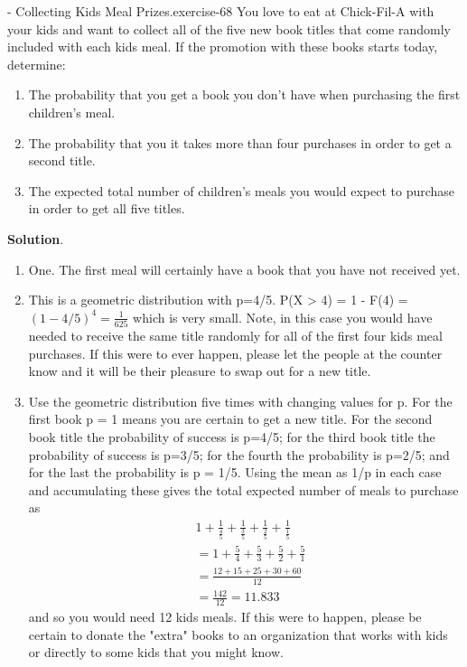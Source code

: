 \documentclass[10pt,]{book}
\numberwithin{equation}{section}
\begin{document}
\begin{inlineexercise}{- Collecting Kids Meal Prizes.}{exercise-68}%
\hypertarget{p-1010}{}%
You love to eat at Chick-Fil-A with your kids and want to collect all of the five new book titles that come randomly included with each kids meal.  If the promotion with these books starts today, determine: \leavevmode%
\begin{enumerate}
\item\hypertarget{li-274}{}The probability that you get a book you don't have when purchasing the first children's meal.%
\item\hypertarget{li-275}{}The probability that you it takes more than four purchases in order to get a second title.%
\item\hypertarget{li-276}{}The expected total number of children's meals you would expect to purchase in order to get all five titles.%
\end{enumerate}
%
\textbf{Solution}.\quad%
\hypertarget{p-1011}{}%
\leavevmode%
\begin{enumerate}
\item\hypertarget{li-277}{}One. The first meal will certainly have a book that you have not received yet.%
\item\hypertarget{li-278}{}This is a geometric distribution with p=4/5.  P(X > 4) = 1 - F(4) = \((1 - 4/5)^4 = \frac{1}{625}\) which is very small. Note, in this case you would have needed to receive the same title randomly for all of the first four kids meal purchases. If this were to ever happen, please let the people at the counter know and it will be their pleasure to swap out for a new title.%
\item\hypertarget{li-279}{}Use the geometric distribution five times with changing values for p. For the first book p = 1 means you are certain to get a new title. For the second book title the probability of success is p=4/5; for the third book title the probability of success is p=3/5; for the fourth the probability is p=2/5; and for the last the probability is p = 1/5. Using the mean as 1/p in each case and accumulating these gives the total expected number of meals to purchase as%
\begin{align*}
& 1 + \frac{1}{\frac{4}{5}} + \frac{1}{\frac{3}{5}} + \frac{1}{\frac{2}{5}} + \frac{1}{\frac{1}{5}} \\
& = 1 + \frac{5}{4} + \frac{5}{3} + \frac{5}{2} + \frac{5}{1} \\
& = \frac{12 + 15 + 25 + 30 + 60}{12} \\
& = \frac{142}{12} = 11.833
\end{align*}
and so you would need 12 kids meals.  If this were to happen, please be certain to donate the "extra" books to an organization that works with kids or directly to some kids that you might know.%
\end{enumerate}
%
\end{inlineexercise}
\end{document}
